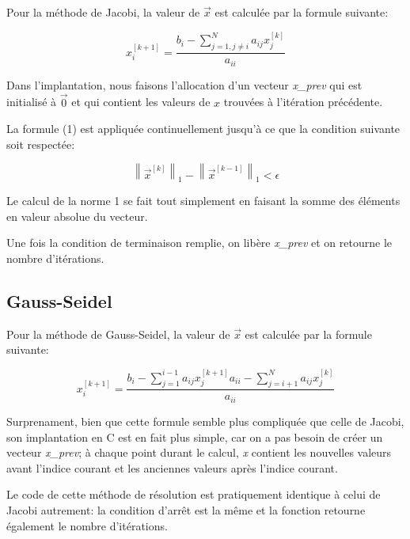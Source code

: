 \documentclass[10pt]{article}
\begin{document}
Pour la méthode de Jacobi, la valeur de $\vec{x}$ est calculée par la
formule suivante:

\[
x_i^{[k+1]} = \frac{b_i - \sum_{j=1, j \ne i}^N
  a_{ij}x_j^{[k]}}{a_{ii}} \tag{1}
\]

Dans l'implantation, nous faisons l'allocation d'un vecteur
\emph{x\_prev} qui est initialisé à $\vec{0}$ et qui contient les
valeurs de $x$ trouvées à l'itération précédente.

La formule (1) est appliquée continuellement jusqu'à ce que la
condition suivante soit respectée:

\[
\left\| \vec{x}^{[k]} \right\|_1 - \left\| \vec{x}^{[k-1]} \right\|_1 < \epsilon
\]

Le calcul de la norme 1 se fait tout simplement en faisant la somme
des éléments en valeur absolue du vecteur.

Une fois la condition de terminaison remplie, on libère
\emph{x\_prev} et on retourne le nombre d'itérations.

\subsection{Gauss-Seidel}

Pour la méthode de Gauss-Seidel, la valeur de $\vec{x}$ est calculée
par la formule suivante:

\[
x_i^{[k+1]} = \frac{b_i - \sum_{j=1}^{i-1}
  a_{ij}x_j^{[k+1]}{a_{ii}} - \sum_{j=i+1}^{N}
  a_{ij}x_j^{[k]}}{a_{ii}}  \tag{2}
\]

Surprenament, bien que cette formule semble plus compliquée que celle
de Jacobi, son implantation en C est en fait plus simple, car on a pas
besoin de créer un vecteur \emph{x\_prev}; à chaque point durant le
calcul, \emph{x} contient les nouvelles valeurs avant l'indice courant
et les anciennes valeurs après l'indice courant.

Le code de cette méthode de résolution est pratiquement identique à
celui de Jacobi autrement: la condition d'arrêt est la même et la
fonction retourne également le nombre d'itérations.
\end{document}
